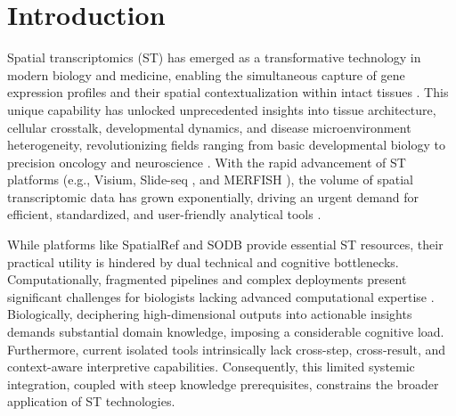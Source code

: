 \documentclass[11pt,a4paper]{article}
\begin{document}
\section{Introduction}
Spatial transcriptomics (ST) has emerged as a transformative technology in modern biology and medicine, enabling the simultaneous capture of gene expression profiles and their spatial contextualization within intact tissues \cite{rao2021exploring,marx2021method}. This unique capability has unlocked unprecedented insights into tissue architecture, cellular crosstalk, developmental dynamics, and disease microenvironment heterogeneity, revolutionizing fields ranging from basic developmental biology to precision oncology and neuroscience \cite{maynard2021transcriptome,xia2025deciphering}. With the rapid advancement of ST platforms (e.g., Visium, Slide-seq \cite{rodriques2019slide}, and MERFISH \cite{chen2015spatially}), the volume of spatial transcriptomic data has grown exponentially, driving an urgent demand for efficient, standardized, and user-friendly analytical tools \cite{moses2022museum}.

While platforms like SpatialRef \cite{cui2025spatialref} and SODB \cite{yuan2023sodb} provide essential ST resources, their practical utility is hindered by dual technical and cognitive bottlenecks. Computationally, fragmented pipelines and complex deployments present significant challenges for biologists lacking advanced computational expertise \cite{fang2023computational,dries2021giotto,palla2022squidpy}. Biologically, deciphering high-dimensional outputs into actionable insights demands substantial domain knowledge, imposing a considerable cognitive load. Furthermore, current isolated tools intrinsically lack cross-step, cross-result, and context-aware interpretive capabilities. Consequently, this limited systemic integration, coupled with steep knowledge prerequisites, constrains the broader application of ST technologies. 
\end{document}

